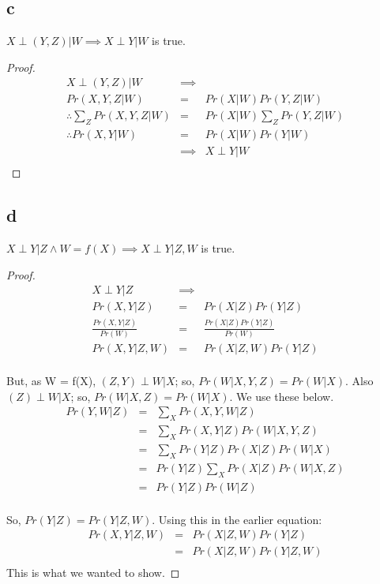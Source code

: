 \documentclass{article}
\begin{document}
\subsection{c}
\begin{claim}
$X \perp (Y, Z) |W  \implies X \perp Y | W$ is true.
\end{claim}
\begin{proof}
\begin{eqnarray*}
X \perp (Y, Z) |W  &\implies&\\
Pr(X, Y, Z|W) &=& Pr(X|W) Pr(Y, Z|W)\\ 
\therefore \sum_Z Pr(X, Y, Z|W) &=& Pr(X|W) \sum_Z Pr(Y, Z|W)\\ 
\therefore Pr(X, Y|W) &=& Pr(X|W) Pr(Y|W)\\ 
&\implies& X \perp Y | W\\
\end{eqnarray*}
\end{proof}


\subsection{d}
\begin{claim}
$X \perp Y |Z \land W = f(X) \implies X \perp Y | Z, W$ is true.
\end{claim}
\begin{proof}
\begin{eqnarray*}
X \perp Y |Z  &\implies&\\
Pr(X, Y|Z) &=& Pr(X|Z) Pr(Y|Z)\\ 
\frac{Pr(X, Y|Z)}{Pr(W)} &=& \frac{Pr(X|Z) Pr(Y|Z)}{Pr(W)}\\ 
Pr(X, Y|Z,W) &=& Pr(X|Z,W) Pr(Y|Z)\\ 
\end{eqnarray*}

But, as W = f(X), $(Z, Y) \perp W | X$; so, $Pr(W|X, Y, Z) = Pr(W|X)$. Also $(Z) \perp W | X$; so, $Pr(W|X, Z) = Pr(W|X)$. We use these below.
\begin{eqnarray*}
Pr(Y, W|Z) &=& \sum_X Pr(X, Y, W | Z)\\
&=& \sum_X Pr(X, Y| Z)Pr(W|X, Y, Z)\\
&=& \sum_X Pr(Y| Z)Pr(X| Z)Pr(W|X)\\
&=& Pr(Y| Z)\sum_X Pr(X| Z)Pr(W|X, Z)\\
&=& Pr(Y| Z)Pr(W|Z)\\
\end{eqnarray*}

So, $Pr(Y|Z) = Pr(Y|Z, W)$. Using this in the earlier equation:
\begin{eqnarray*}
Pr(X, Y|Z,W) &=& Pr(X|Z,W) Pr(Y|Z)\\
&=& Pr(X|Z,W) Pr(Y|Z, W)\\
\end{eqnarray*}
This is what we wanted to show.
\end{proof}
\end{document}
